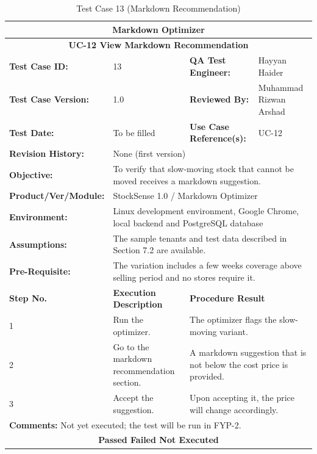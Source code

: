 \documentclass{StockSense}
\begin{document}
\begin{table}[!htbp]
\centering
\caption{Test Case 13 (Markdown Recommendation)}
{\small\linespread{1}\selectfont\renewcommand{\arraystretch}{1.25}
\begin{tabular}{|p{}|p{}|p{}|p{}|}
\hline
\multicolumn{4}{|c|}{\textbf{Markdown Optimizer}} \\ \hline
\multicolumn{4}{|c|}{\textbf{UC-12 View Markdown Recommendation}} \\ \hline
\textbf{Test Case ID:} & 13 & \textbf{QA Test Engineer:} & Hayyan Haider \\ \hline
\textbf{Test Case Version:} & 1.0 & \textbf{Reviewed By:} & Muhammad Rizwan Arshad \\ \hline
\textbf{Test Date:} & To be filled & \textbf{Use Case Reference(s):} & UC-12 \\ \hline
\textbf{Revision History:} & \multicolumn{3}{p{\dimexpr0.70\textwidth+4\tabcolsep\relax}|}{None (first version)} \\ \hline
\textbf{Objective:} & \multicolumn{3}{p{\dimexpr0.70\textwidth+4\tabcolsep\relax}|}{To verify that slow-moving stock that cannot be moved receives a markdown suggestion.} \\ \hline
\textbf{Product/Ver/Module:} & \multicolumn{3}{p{\dimexpr0.70\textwidth+4\tabcolsep\relax}|}{StockSense 1.0 / Markdown Optimizer} \\ \hline
\textbf{Environment:} & \multicolumn{3}{p{\dimexpr0.70\textwidth+4\tabcolsep\relax}|}{Linux development environment, Google Chrome, local backend and PostgreSQL database} \\ \hline
\textbf{Assumptions:} & \multicolumn{3}{p{\dimexpr0.70\textwidth+4\tabcolsep\relax}|}{The sample tenants and test data described in Section 7.2 are available.} \\ \hline
\textbf{Pre-Requisite:} & \multicolumn{3}{p{\dimexpr0.70\textwidth+4\tabcolsep\relax}|}{The variation includes a few weeks coverage above selling period and no stores require it.} \\ \hline
\textbf{Step No.} & \textbf{Execution Description} & \multicolumn{2}{l|}{\textbf{Procedure Result}} \\ \hline
1 & Run the optimizer. & \multicolumn{2}{p{\dimexpr0.42\textwidth+2\tabcolsep\relax}|}{The optimizer flags the slow-moving variant.} \\ \hline
2 & Go to the markdown recommendation section. & \multicolumn{2}{p{\dimexpr0.42\textwidth+2\tabcolsep\relax}|}{A markdown suggestion that is not below the cost price is provided.} \\ \hline
3 & Accept the suggestion. & \multicolumn{2}{p{\dimexpr0.42\textwidth+2\tabcolsep\relax}|}{Upon accepting it, the price will change accordingly.} \\ \hline
\multicolumn{4}{|l|}{\textbf{Comments:} Not yet executed; the test will be run in FYP-2.} \\ \hline
\multicolumn{4}{|c|}{\textbf{Passed \quad Failed \quad Not Executed}} \\ \hline
\end{tabular}\par}
\end{table}
\end{document}

